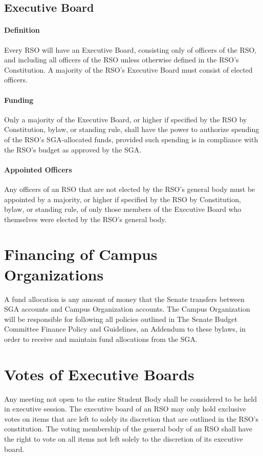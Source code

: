 \documentclass[12pt]{scrreprt}
\begin{document}
\subsection{Executive Board}

\paragraph{Definition}
Every RSO will have an Executive Board, consisting only of officers of
the RSO, and including all officers of the RSO unless otherwise
defined in the RSO’s Constitution. A majority of the RSO’s Executive
Board must consist of elected officers.

\paragraph{Funding}
Only a majority of the Executive Board, or higher if specified by the
RSO by Constitution, bylaw, or standing rule, shall have the power to
authorize spending of the RSO’s SGA-allocated funds, provided such
spending is in compliance with the RSO’s budget as approved by the
SGA.

\paragraph{Appointed Officers}
Any officers of an RSO that are not elected by the RSO’s general body
must be appointed by a majority, or higher if specified by the RSO by
Constitution, bylaw, or standing rule, of only those members of the
Executive Board who themselves were elected by the RSO’s general body.

\section{Financing of Campus Organizations}

A fund allocation is any amount of money that the Senate transfers between SGA accounts and Campus Organization accounts. The Campus Organization will be responsible for following all policies outlined in The Senate Budget Committee Finance Policy and Guidelines, an Addendum to these bylaws, in order to receive and maintain fund allocations from the SGA.

\section{Votes of Executive Boards}
Any meeting not open to the entire Student Body shall be considered to be held 
in executive session. The executive board of an RSO may only hold exclusive votes on items that are left to solely its discretion that are outlined in the RSO’s constitution. The voting membership of the general body of an RSO shall have the right to vote on all items not left solely to the discretion of its executive board.
\end{document}
